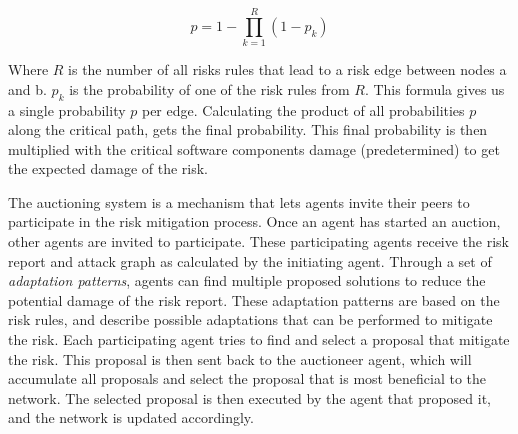 \[p = 1 - \prod_{k=1}^{R}(1-p_{k}) \]

Where $R$ is the number of all risks rules that lead to a risk edge between nodes a and b. $p_{k}$ is the probability of one of the risk rules from $R$. This formula gives us a single probability $p$ per edge. Calculating the product of all probabilities $p$ along the critical path, gets the final probability. This final probability is then multiplied with the critical software components damage (predetermined) to get the expected damage of the risk.

\vspace{0.5em}
The auctioning system is a mechanism that lets agents invite their peers to participate in the risk mitigation process. Once an agent has started an auction, other agents are invited to participate. These participating agents receive the risk report and attack graph as calculated by the initiating agent. Through a set of \emph{adaptation patterns}, agents can find multiple proposed solutions to reduce the potential damage of the risk report. These adaptation patterns are based on the risk rules, and describe possible adaptations that can be performed to mitigate the risk.
Each participating agent tries to find and select a proposal that mitigate the risk. This proposal is then sent back to the auctioneer agent, which will accumulate all proposals and select the proposal that is most beneficial to the network. The selected proposal is then executed by the agent that proposed it, and the network is updated accordingly.
